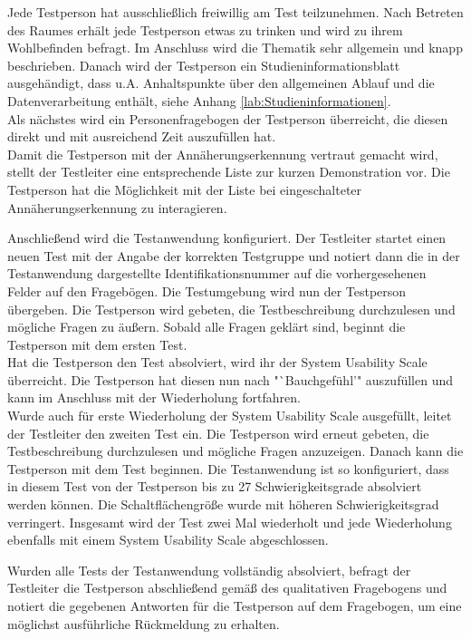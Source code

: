 \documentclass[a4paper,12pt,bibliography=totoc]{scrreprt}%
\begin{document}
Jede Testperson hat ausschließlich freiwillig am Test teilzunehmen. Nach Betreten des Raumes erhält jede Testperson etwas zu trinken und wird zu ihrem Wohlbefinden befragt. Im Anschluss wird die Thematik sehr allgemein und knapp beschrieben. Danach wird der Testperson ein Studieninformationsblatt ausgehändigt, dass u.A. Anhaltspunkte über den allgemeinen Ablauf und die Datenverarbeitung enthält, siehe Anhang \ref{lab:Studieninformationen}.\\
Als nächstes wird ein Personenfragebogen der Testperson überreicht, die diesen direkt und mit ausreichend Zeit auszufüllen hat.\\
Damit die Testperson mit der Annäherungserkennung vertraut gemacht wird, stellt der Testleiter eine entsprechende Liste zur kurzen Demonstration vor. Die Testperson hat die Möglichkeit mit der Liste bei eingeschalteter Annäherungserkennung zu interagieren.

Anschließend wird die Testanwendung konfiguriert. Der Testleiter startet einen neuen Test mit der Angabe der korrekten Testgruppe und notiert dann die in der Testanwendung dargestellte Identifikationsnummer auf die vorhergesehenen Felder auf den Fragebögen. Die Testumgebung wird nun der Testperson übergeben. Die Testperson wird gebeten, die Testbeschreibung durchzulesen und mögliche Fragen zu äußern. Sobald alle Fragen geklärt sind, beginnt die Testperson mit dem ersten Test.\\
Hat die Testperson den Test absolviert, wird ihr der System Usability Scale überreicht. Die Testperson hat diesen nun nach "`Bauchgefühl'" auszufüllen und kann im Anschluss mit der Wiederholung fortfahren.\\
Wurde auch für erste Wiederholung der System Usability Scale ausgefüllt, leitet der Testleiter den zweiten Test ein. Die Testperson wird erneut gebeten, die Testbeschreibung durchzulesen und mögliche Fragen anzuzeigen. Danach kann die Testperson mit dem Test beginnen. Die Testanwendung ist so konfiguriert, dass in diesem Test von der Testperson bis zu 27 Schwierigkeitsgrade absolviert werden können. Die Schaltflächengröße wurde mit höheren Schwierigkeitsgrad verringert. Insgesamt wird der Test zwei Mal wiederholt und jede Wiederholung ebenfalls mit einem System Usability Scale abgeschlossen.

Wurden alle Tests der Testanwendung vollständig absolviert, befragt der Testleiter die Testperson abschließend gemäß des qualitativen Fragebogens und notiert die gegebenen Antworten für die Testperson auf dem Fragebogen, um eine möglichst ausführliche Rückmeldung zu erhalten. 
\end{document}
